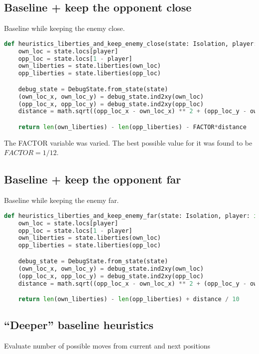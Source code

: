 \documentclass[aps,prd,notitlepage,floatfix,superscriptaddress,groupedaddress,nofootinbib]{revtex4-1}
\begin{document}
\subsection*{Baseline + keep the opponent close}
Baseline while keeping the enemy close.

\begin{lstlisting}[language=python]
def heuristics_liberties_and_keep_enemy_close(state: Isolation, player: int):
    own_loc = state.locs[player]
    opp_loc = state.locs[1 - player]
    own_liberties = state.liberties(own_loc)
    opp_liberties = state.liberties(opp_loc)

    debug_state = DebugState.from_state(state)
    (own_loc_x, own_loc_y) = debug_state.ind2xy(own_loc)
    (opp_loc_x, opp_loc_y) = debug_state.ind2xy(opp_loc)
    distance = math.sqrt((opp_loc_x - own_loc_x) ** 2 + (opp_loc_y - own_loc_y) ** 2)

    return len(own_liberties) - len(opp_liberties) - FACTOR*distance
\end{lstlisting}

The FACTOR variable was varied. The best possible value for it was found to be $FACTOR=1/12$.

\subsection*{Baseline + keep the opponent far}
Baseline while keeping the enemy far.

\begin{lstlisting}[language=python]
def heuristics_liberties_and_keep_enemy_far(state: Isolation, player: int):
    own_loc = state.locs[player]
    opp_loc = state.locs[1 - player]
    own_liberties = state.liberties(own_loc)
    opp_liberties = state.liberties(opp_loc)

    debug_state = DebugState.from_state(state)
    (own_loc_x, own_loc_y) = debug_state.ind2xy(own_loc)
    (opp_loc_x, opp_loc_y) = debug_state.ind2xy(opp_loc)
    distance = math.sqrt((opp_loc_x - own_loc_x) ** 2 + (opp_loc_y - own_loc_y) ** 2)

    return len(own_liberties) - len(opp_liberties) + distance / 10
\end{lstlisting}

\subsection*{``Deeper'' baseline heuristics}
Evaluate number of possible moves from current and next positions
\end{document}
